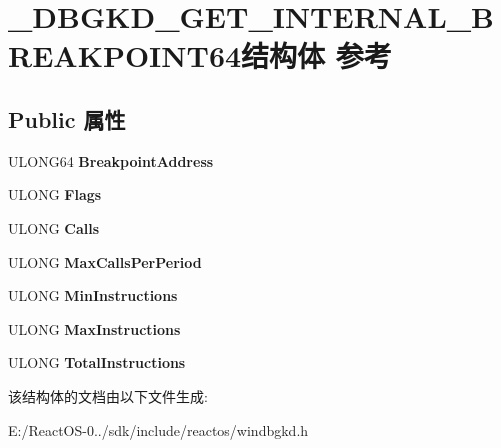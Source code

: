 \hypertarget{struct___d_b_g_k_d___g_e_t___i_n_t_e_r_n_a_l___b_r_e_a_k_p_o_i_n_t64}{}\section{\+\_\+\+D\+B\+G\+K\+D\+\_\+\+G\+E\+T\+\_\+\+I\+N\+T\+E\+R\+N\+A\+L\+\_\+\+B\+R\+E\+A\+K\+P\+O\+I\+N\+T64结构体 参考}
\label{struct___d_b_g_k_d___g_e_t___i_n_t_e_r_n_a_l___b_r_e_a_k_p_o_i_n_t64}
\subsection*{Public 属性}
\begin{DoxyCompactItemize}
\item 
\mbox{\label{struct___d_b_g_k_d___g_e_t___i_n_t_e_r_n_a_l___b_r_e_a_k_p_o_i_n_t64_a3b09e3f9c08ab5530ee724a9b5cc07be}} 
U\+L\+O\+N\+G64 {\bfseries Breakpoint\+Address}
\item 
\mbox{\label{struct___d_b_g_k_d___g_e_t___i_n_t_e_r_n_a_l___b_r_e_a_k_p_o_i_n_t64_ae1588025eb4301a8006d77266aa02b9a}} 
U\+L\+O\+NG {\bfseries Flags}
\item 
\mbox{\label{struct___d_b_g_k_d___g_e_t___i_n_t_e_r_n_a_l___b_r_e_a_k_p_o_i_n_t64_a080b504e75f05e1f4a9565c5af94fe08}} 
U\+L\+O\+NG {\bfseries Calls}
\item 
\mbox{\label{struct___d_b_g_k_d___g_e_t___i_n_t_e_r_n_a_l___b_r_e_a_k_p_o_i_n_t64_aa90f66e2879860e31ccee1defb564c3e}} 
U\+L\+O\+NG {\bfseries Max\+Calls\+Per\+Period}
\item 
\mbox{\label{struct___d_b_g_k_d___g_e_t___i_n_t_e_r_n_a_l___b_r_e_a_k_p_o_i_n_t64_a16370c794ea66ecb452ac7afe6ad707e}} 
U\+L\+O\+NG {\bfseries Min\+Instructions}
\item 
\mbox{\label{struct___d_b_g_k_d___g_e_t___i_n_t_e_r_n_a_l___b_r_e_a_k_p_o_i_n_t64_ab98ac067e8bf5ace7c858a23620201a5}} 
U\+L\+O\+NG {\bfseries Max\+Instructions}
\item 
\mbox{\label{struct___d_b_g_k_d___g_e_t___i_n_t_e_r_n_a_l___b_r_e_a_k_p_o_i_n_t64_abf5c8862ba598e011d7999479607892b}} 
U\+L\+O\+NG {\bfseries Total\+Instructions}
\end{DoxyCompactItemize}


该结构体的文档由以下文件生成\+:\begin{DoxyCompactItemize}
\item 
E\+:/\+React\+O\+S-\/0../sdk/include/reactos/windbgkd.\+h\end{DoxyCompactItemize}
